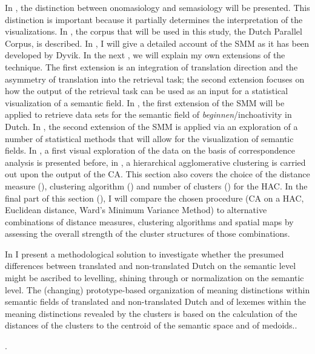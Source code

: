 In , the distinction between onomasiology and semasiology will be presented. This distinction is important because it partially determines the interpretation of the visualizations. In , the corpus that will be used in this study, the Dutch Parallel Corpus, is described. In , I will give a detailed account of the SMM as it has been developed by Dyvik. In the next , we will explain my own extensions of the technique. The first extension is an integration of translation direction and the asymmetry of translation into the retrieval task; the second extension focuses on how the output of the retrieval task can be used as an input for a statistical visualization of a semantic field. In , the first extension of the SMM will be applied to retrieve data sets for the semantic field of \textit{beginnen}/inchoativity in Dutch. In , the second extension of the SMM is applied via an exploration of a number of statistical methods that will allow for the visualization of semantic fields. In , a first visual exploration of the data on the basis of correspondence analysis is presented before, in , a hierarchical agglomerative clustering is carried out upon the output of the CA. This section also covers the choice of the distance measure (), clustering algorithm () and number of clusters () for the HAC. In the final part of this section (), I will compare the chosen procedure (CA on a HAC, Euclidean distance, Ward’s Minimum Variance Method) to alternative combinations of distance measures, clustering algorithms and spatial maps by assessing the overall strength of the cluster structures of those combinations.



In  I present a methodological solution to investigate whether the presumed differences between translated and non-translated Dutch on the semantic level might be ascribed to levelling, shining through or normalization on the semantic level. The (changing) prototype-based organization of meaning distinctions within semantic fields of translated and non-translated Dutch and of lexemes within the meaning distinctions revealed by the clusters is based on the calculation of the distances of the clusters to the centroid of the semantic space and of medoids..



.


